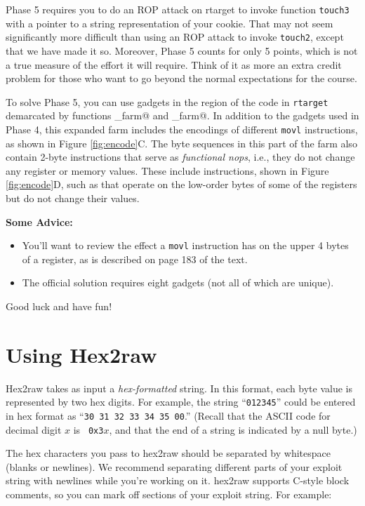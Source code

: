\documentclass[11pt]{article}
\begin{document}
Phase 5 requires you to do an ROP attack on {\sc rtarget} to invoke
function {\tt touch3} with a pointer to a string representation of
your cookie.  That may not seem significantly more difficult than using an
ROP attack to invoke {\tt touch2}, except that we have made it so.
Moreover, Phase 5 counts for only 5 points, which is not a true
measure of the effort it will require.  Think of it as more an extra
credit problem for those who want to go beyond the normal expectations
for the course. 

To solve Phase 5, you can use gadgets in the region of the code in {\tt rtarget}
demarcated by functions \verb@start_farm@ and
\verb@end_farm@.  In addition to the gadgets used in Phase 4,
this expanded farm includes the encodings of different {\tt movl} instructions, as
shown in Figure \ref{fig:encode}C.  The byte sequences in
this part of the farm also contain 
2-byte instructions that serve as {\em
  functional nops}, i.e., they do not change any register or memory values.
These include instructions, shown in Figure \ref{fig:encode}D, such as 
\verb@andb %al,%al@,
%
that operate on the low-order bytes of some of the registers but do
not change their values.

{\bf Some Advice:}
\begin{itemize}
\item You'll want to review the effect a {\tt movl} instruction has on
  the upper 4 bytes of a register, as is described on page 183 of the text.
\item The official solution requires eight gadgets (not all of which
  are unique).  
\end{itemize}


Good luck and have fun!

\appendix

\section{Using {\sc Hex2raw}}
\label{app:hex2raw}

{\sc Hex2raw} takes
as input a {\em hex-formatted} string.  In this format, each byte
value is represented by two hex digits.  For example, the string
``{\tt 012345}'' could be entered in hex format as ``{\tt 30 31 32 33
34 35 00}.'' (Recall that the ASCII code for decimal digit $x$ is {\tt
0x3}$x$, and that the end of a string is indicated by a null byte.)

The hex characters you pass to {\sc hex2raw} should be separated by
whitespace (blanks or newlines). We recommend separating different
parts of your exploit string with newlines while you're working on
it. {\sc hex2raw} supports C-style block comments, so you can
mark off sections of your exploit string. For example:
\end{document}
